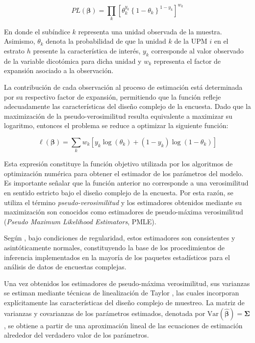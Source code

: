 \documentclass[
  spanish,
  12pt,
]{book}
\begin{document}
\[
PL(\boldsymbol{\beta})
=
\prod_{k}
\left[
\theta_{k}^{y_{k}}
\left\{
1-\theta_{k}
\right\}^{1-y_{k}}
\right]^{w_{k}}
\]

En donde el subíndice \(k\) representa una unidad observada de la muestra. Asimismo, \(\theta_{k}\) denota la probabilidad de que la unidad \(k\) de la UPM \(i\) en el estrato \(h\) presente la característica de interés, \(y_{k}\) corresponde al valor observado de la variable dicotómica para dicha unidad y \(w_{k}\) representa el factor de expansión asociado a la observación.

La contribución de cada observación al proceso de estimación está determinada por su respectivo factor de expansión, permitiendo que la función refleje adecuadamente las características del diseño complejo de la encuesta. Dado que la maximización de la pseudo-verosimilitud resulta equivalente a maximizar su logaritmo, entonces el problema se reduce a optimizar la siguiente función:

\[
\ell(\boldsymbol{\beta})
=
\sum_{k}
w_{k}
\left[
y_{k}\log(\theta_{k})
+
(1-y_{k})
\log(1-\theta_{k})
\right]
\]

Esta expresión constituye la función objetivo utilizada por los algoritmos de optimización numérica para obtener el estimador de los parámetros del modelo. Es importante señalar que la función anterior no corresponde a una verosimilitud en sentido estricto bajo el diseño complejo de la encuesta. Por esta razón, se utiliza el término \emph{pseudo-verosimilitud} y los estimadores obtenidos mediante su maximización son conocidos como estimadores de pseudo-máxima verosimilitud (\emph{Pseudo Maximum Likelihood Estimators}, PMLE).

Según \citet{molina1992pseudo}, bajo condiciones de regularidad, estos estimadores son consistentes y asintóticamente normales, constituyendo la base de los procedimientos de inferencia implementados en la mayoría de los paquetes estadísticos para el análisis de datos de encuestas complejas.

Una vez obtenidos los estimadores de pseudo-máxima verosimilitud, sus varianzas se estiman mediante técnicas de linealización de Taylor \citep{binder1983variances}, las cuales incorporan explícitamente las características del diseño complejo de muestreo. La matriz de varianzas y covarianzas de los parámetros estimados, denotada por \(\text{Var}(\hat{\boldsymbol{\beta}})=\boldsymbol{\Sigma}\), se obtiene a partir de una aproximación lineal de las ecuaciones de estimación alrededor del verdadero valor de los parámetros.
\end{document}
